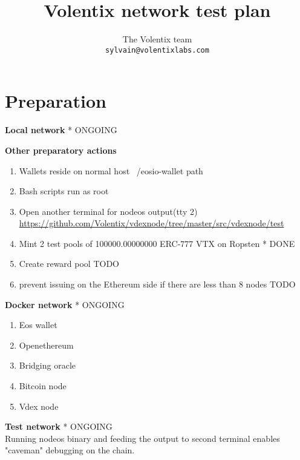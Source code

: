 \documentclass[]{article}
\title{Volentix network test plan}
\author{
		The Volentix team\\
	\texttt{sylvain@volentixlabs.com}
}
\begin{document}
\maketitle


\section{Preparation}

\textbf{Local network}  * {\color{green} ONGOING}


 \textbf{Other preparatory actions}
  		\begin{enumerate}

  		    \item Wallets reside on normal host ~/eosio-wallet path
		   \item Bash scripts run as root
		   	\item Open another terminal for nodeos output(tty 2)
  			\url{https://github.com/Volentix/vdexnode/tree/master/src/vdexnode/test} 
 		  \item Mint 2 test pools of 100000.00000000 ERC-777 VTX on Ropsten  * {\color{green} DONE}
 		  \item Create reward pool {\color{red} TODO}
		  \item prevent issuing on the Ethereum side if there are less than 8 nodes {\color{red} TODO}
		   
	 \end{enumerate}
   \textbf{Docker network}	  * {\color{yellow} ONGOING}
  \begin{enumerate}
  	\item Eos wallet
  	\item Openethereum
  	\item Bridging oracle
  	\item Bitcoin node
  	\item Vdex node
  \end{enumerate}
   \textbf{Test network}	  * {\color{yellow} ONGOING}\\
   Running nodeos binary and feeding the output to second terminal enables "caveman"
   debugging on the chain. 
   
\end{document}

